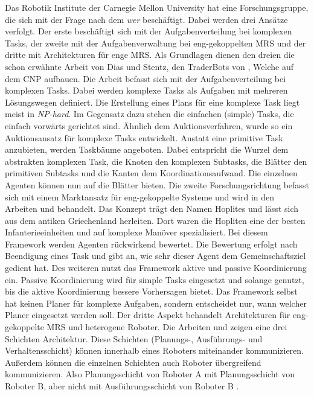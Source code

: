 Das Robotik Institute der Carnegie Mellon University hat eine Forschungsgruppe, die sich mit der Frage nach dem \textit{wer} beschäftigt. Dabei werden drei Ansätze verfolgt. Der erste beschäftigt sich mit der Aufgabenverteilung bei komplexen Tasks, der zweite mit der Aufgabenverwaltung bei eng-gekoppelten MRS und der dritte mit Architekturen für enge MRS. Als Grundlagen dienen den dreien die schon erwähnte Arbeit von Dias und Stentz, den TraderBots von \cite{dias2000market}, Welche auf dem CNP aufbauen. Die Arbeit \cite{zlot2005complex} befasst sich mit der Aufgabenverteilung bei komplexen Tasks. Dabei werden komplexe Tasks als Aufgaben mit mehreren Lösungswegen definiert. Die Erstellung eines Plans für eine komplexe Task liegt meist in \textit{NP-hard}. Im Gegensatz dazu stehen die einfachen (simple) Tasks, die einfach vorwärts gerichtet sind. Ähnlich dem Auktionsverfahren, wurde so ein Auktionsansatz für komplexe Tasks entwickelt. Anstatt eine primitive Task anzubieten, werden Taskbäume angeboten. Dabei entspricht die Wurzel dem abstrakten komplexen Task, die Knoten den komplexen Subtasks, die Blätter den primitiven Subtasks und die Kanten dem Koordinationsaufwand. Die einzelnen Agenten können nun auf die Blätter bieten. Die zweite Forschungsrichtung befasst sich mit einem Marktansatz für eng-gekoppelte Systeme und wird in den Arbeiten \cite{kalra2004hoplites} und \cite{kalra2005hoplites} behandelt. Das Konzept trägt den Namen Hoplites und lässt sich aus dem antiken Griechenland herleiten. Dort waren die Hopliten eine der besten Infanterieeinheiten und auf komplexe Manöver spezialisiert. Bei diesem Framework werden Agenten rückwirkend bewertet. Die Bewertung erfolgt nach Beendigung eines Task und gibt an, wie sehr dieser Agent dem Gemeinschaftsziel gedient hat. Des weiteren nutzt das Framework aktive und passive Koordinierung ein. Passive Koordinierung wird für simple Tasks eingesetzt und solange genutzt, bis die aktive Koordinierung bessere Vorhersagen bietet. Das Framework selbst hat keinen Planer für komplexe Aufgaben, sondern entscheidet nur, wann welcher Planer eingesetzt werden soll. Der dritte Aspekt behandelt Architekturen für eng-gekoppelte MRS und heterogene Roboter. Die Arbeiten \cite{simmons2001first} und \cite{simmons2002layered} zeigen eine drei Schichten Architektur. Diese Schichten (Planungs-, Ausführungs- und Verhaltensschicht) können innerhalb eines Roboters miteinander kommunizieren. Außerdem können die einzelnen Schichten auch Roboter übergreifend kommunizieren. Also Planungsschicht von Roboter A mit Planungsschicht von Roboter B, aber nicht mit Ausführungsschicht von Roboter B \citep{lundh2006plan}.

